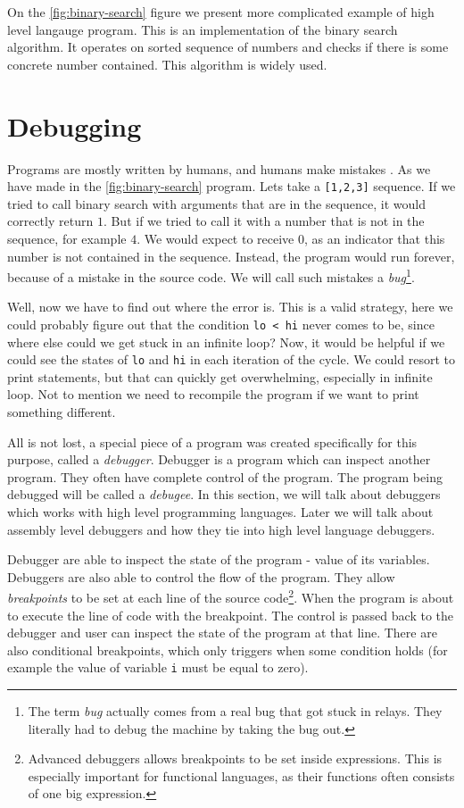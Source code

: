 On the \ref{fig:binary-search} figure we present more complicated example of high level langauge program. This
is an implementation of the binary search algorithm. It operates on sorted sequence of numbers and checks
if there is some concrete number contained. This algorithm is widely used.

\section{Debugging}
Programs are mostly written by humans, and humans make mistakes \cite{human-error}.
As we have made in the \ref{fig:binary-search} program. Lets take a \texttt{[1,2,3]} sequence.
If we tried to call binary search with arguments that are in the sequence, it would correctly
return $1$. But if we tried to call it with a number that is not in the sequence, for example $4$.
We would expect to receive $0$, as an indicator that this number is not contained in the sequence.
Instead, the program would run forever, because of a mistake in the source code. We will call such mistakes
a \textit{bug}\footnote{The term \textit{bug} actually comes from a real bug that got stuck in relays.
They literally had to debug the machine by taking the bug out.}.

Well, now we have to find out where the error is. This is a valid strategy, here we could probably
figure out that the condition \texttt{lo < hi} never comes to be, since where else could we get
stuck in an infinite loop? Now, it would be helpful if we could see the states of \texttt{lo} and
\texttt{hi} in each iteration of the cycle. We could resort to print statements, but that can
quickly get overwhelming, especially in infinite loop. Not to mention we need to recompile
the program if we want to print something different.

All is not lost, a special piece of a program was created specifically for this purpose, called a \textit{debugger}.
Debugger is a program which can inspect another program. They often have complete control of the program.
The program being debugged will be called a \textit{debugee}. In this section, we will talk about debuggers
which works with high level programming languages. Later we will talk about assembly level debuggers and
how they tie into high level language debuggers.

Debugger are able to inspect the state of the program - value of its variables. Debuggers are also able to control
the flow of the program. They allow \textit{breakpoints} to be set at each line of the source code\footnote{Advanced debuggers allows breakpoints to be set inside expressions.
This is especially important for functional languages, as their functions often consists of one big expression.}.
When the program is about to execute the line of code with the breakpoint. The control is passed back to the
debugger and user can inspect the state of the program at that line. There are also conditional breakpoints,
which only triggers when some condition holds (for example the value of variable \texttt{i} must be equal to zero).

